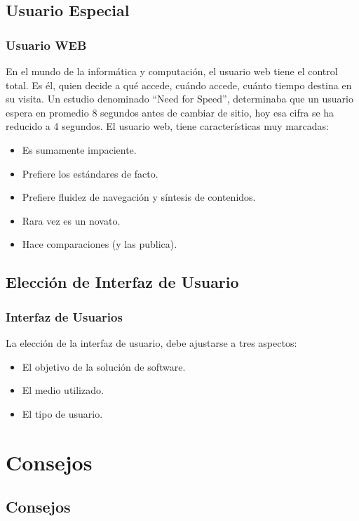\documentclass[12pt]{beamer}
\begin{document}
\subsection{Usuario Especial}

\begin{frame}
 \frametitle{Usuario WEB}
 En el mundo de la informática y computación, el usuario web tiene el control total. Es él, quien decide a qué accede, cuándo accede, cuánto tiempo destina en su visita.
 \newline
 Un estudio denominado ``Need for Speed'', determinaba que un usuario espera en promedio 8 segundos antes de cambiar de sitio, hoy esa cifra se ha reducido a 4 segundos. El usuario web, tiene características muy marcadas:
 \begin{itemize}
  \item<2-> Es sumamente \alert{impaciente}.
  \item<3-> Prefiere los estándares de facto.
  \item<4-> Prefiere fluidez de navegación y síntesis de contenidos.
  \item<5-> Rara vez es un novato.
  \item<6-> Hace comparaciones (y las publica).
 \end{itemize}
\end{frame}


\subsection{Elección de Interfaz de Usuario}

\begin{frame}
 \frametitle{Interfaz de Usuarios}
 La elección de la interfaz de usuario, debe ajustarse a tres aspectos:
 \begin{itemize}
  \item<2-> El objetivo de la solución de software.
  \item<3-> El medio utilizado.
  \item<4-> El tipo de usuario.
 \end{itemize}
\end{frame}

\section{Consejos}
\subsection{Consejos}
\end{document}

